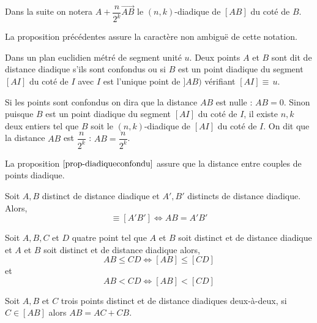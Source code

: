 \begin{rema}
    Dans la suite on notera $A + \dfrac{n}{2^k}\overrightarrow{AB}$ le $(n,k)$-diadique de $[AB]$ du coté de $B$.

    La proposition précédentes assure la caractère non ambiguë de cette notation.
\end{rema}
\begin{defi}
    Dans un plan euclidien métré de segment unité $u$. Deux points $A$ et $B$ sont dit de distance diadique s'ils sont confondus ou si $B$ est un point diadique du segment $[AI]$ du coté de $I$ avec $I$ est l'unique point de $]AB)$ vérifiant $[AI]\equiv \, u$.

    Si les points sont confondus on dira que la distance $AB$ est nulle : $AB=0$. Sinon puisque $B$ est un point diadique du segment $[AI]$ du coté de $I$, il existe $n,k$ deux entiers tel que $B$ soit le $(n,k)$-diadique de $[AI]$ du coté de $I$. On dit que la distance $AB$ est $\dfrac{n}{2^k}$ : $AB=\dfrac{n}{2^k}$.
\end{defi}
\begin{rema}
    La proposition $\ref{prop-diadiqueconfondu}$ assure que la distance entre couples de points diadique. 
\end{rema}
\begin{thm}\label{thm-equivcongrudist}
    Soit $A,B$ distinct de distance diadique et $A',B'$ distincts de distance diadique. Alors,
    \begin{equation*}
        [AB]\equiv[A'B'] \Longleftrightarrow AB = A'B'
    \end{equation*}
\end{thm}
\begin{thm}\label{thm-ordredistancesegmentdiadique}
    Soit $A,B,C$ et $D$ quatre point tel que $A$ et $B$ soit distinct et de distance diadique et $A$ et $B$ soit distinct et de distance diadique alors,
    \begin{equation*}
        AB \leq CD \Longleftrightarrow [AB]\leq[CD]
    \end{equation*}
    et 
    \begin{equation*}
        AB <CD \Longleftrightarrow [AB]<[CD]
    \end{equation*}
\end{thm}
\begin{prop}\label{prop-addlongdiadique}
    Soit $A,B$ et $C$ trois points distinct et de distance diadiques deux-à-deux, si $C\in [AB]$ alors $AB = AC + CB$.
\end{prop}

